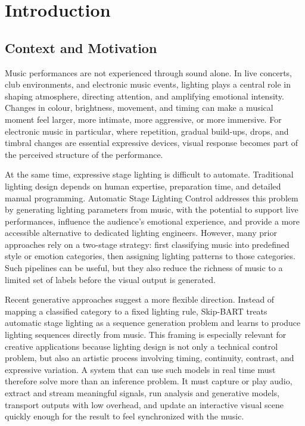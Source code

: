 \chapter{Introduction}

\label{intro}

\section{Context and Motivation}

Music performances are not experienced through sound alone. In live concerts, club environments, and electronic music events, lighting plays a central role in shaping atmosphere, directing attention, and amplifying emotional intensity. Changes in colour, brightness, movement, and timing can make a musical moment feel larger, more intimate, more aggressive, or more immersive. For electronic music in particular, where repetition, gradual build-ups, drops, and timbral changes are essential expressive devices, visual response becomes part of the perceived structure of the performance.

At the same time, expressive stage lighting is difficult to automate. Traditional lighting design depends on human expertise, preparation time, and detailed manual programming. Automatic Stage Lighting Control addresses this problem by generating lighting parameters from music, with the potential to support live performances, influence the audience's emotional experience, and provide a more accessible alternative to dedicated lighting engineers. However, many prior approaches rely on a two-stage strategy: first classifying music into predefined style or emotion categories, then assigning lighting patterns to those categories. Such pipelines can be useful, but they also reduce the richness of music to a limited set of labels before the visual output is generated.

Recent generative approaches suggest a more flexible direction. Instead of mapping a classified category to a fixed lighting rule, Skip-BART treats automatic stage lighting as a sequence generation problem and learns to produce lighting sequences directly from music. This framing is especially relevant for creative applications because lighting design is not only a technical control problem, but also an artistic process involving timing, continuity, contrast, and expressive variation. A system that can use such models in real time must therefore solve more than an inference problem. It must capture or play audio, extract and stream meaningful signals, run analysis and generative models, transport outputs with low overhead, and update an interactive visual scene quickly enough for the result to feel synchronized with the music.

